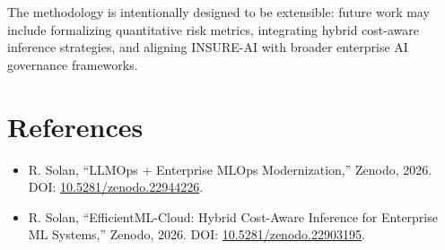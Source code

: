 \documentclass{article}
\begin{document}
The methodology is intentionally designed to be extensible: future work may include formalizing quantitative risk metrics, integrating hybrid cost-aware inference strategies, and aligning INSURE-AI with broader enterprise AI governance frameworks.

\section*{References}
\begin{itemize}
    \item R. Solan, ``LLMOps + Enterprise MLOps Modernization,'' Zenodo, 2026. DOI: \href{https://doi.org/10.5281/zenodo.22944226}{10.5281/zenodo.22944226}.
    \item R. Solan, ``EfficientML-Cloud: Hybrid Cost-Aware Inference for Enterprise ML Systems,'' Zenodo, 2026. DOI: \href{https://doi.org/10.5281/zenodo.22903195}{10.5281/zenodo.22903195}.
\end{itemize}
\end{document}
